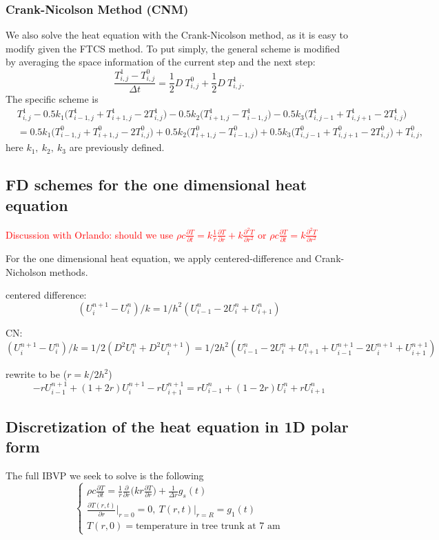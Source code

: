 \documentclass[12pt]{article}
\begin{document}
\subsubsection{Crank-Nicolson Method (CNM)}
We also solve the heat equation with the Crank-Nicolson method, as it is easy to modify given the FTCS method. To put simply, the general scheme is modified by averaging the space information of the current step and the next step:
\begin{equation}
\frac{T^1_{i,j}-T^0_{i,j}}{\Delta t}=\frac{1}{2}D\ T^0_{i,j}+\frac{1}{2}D\ T^1_{i,j}.
\end{equation}
The specific scheme is 
\begin{align}
& T^1_{i,j}-0.5k_1\bigg(T^1_{i-1,j}+T^1_{i+1,j}-2T^1_{i,j}\bigg)-0.5k_2\bigg(T^1_{i+1,j}-T^1_{i-1,j}\bigg)
-0.5k_3\bigg(T^1_{i,j-1}+T^1_{i,j+1}-2T^1_{i,j}\bigg)\nonumber\\
&= 0.5k_1\bigg(T^0_{i-1,j}+T^0_{i+1,j}-2T^0_{i,j}\bigg)+0.5k_2\bigg(T^0_{i+1,j}-T^0_{i-1,j}\bigg)
+0.5k_3\bigg(T^0_{i,j-1}+T^0_{i,j+1}-2T^0_{i,j}\bigg)+T^0_{i,j},
\end{align}
here $k_1,\ k_2,\ k_3$ are previously defined. 

\subsection{FD schemes for the one dimensional heat equation}

\textcolor{red}{Discussion with Orlando: should we use $\rho c\frac{\partial T}{\partial t}=k\frac{1}{r}\frac{\partial T}{\partial r}+k\frac{\partial^2T}{\partial r^2}$ or $\rho c\frac{\partial T}{\partial t}=k\frac{\partial^2T}{\partial r^2}$}

For the one dimensional heat equation, we apply centered-difference and Crank-Nicholson methods. 

centered difference:
$$(U^{n+1}_i - U^n_i)/k = 1/h^2 (U^n_{i-1} - 2U^n_i + U^n_{i+1})$$

CN:
$$(U^{n+1}_i - U^n_i)/k = 1/2 (D^2U^n_i + D^2U^{n+1}_i) 
=1/2h^2(U^n_{i-1} - 2U^n_i + U^n_{i+1} + U^{n+1}_{i-1} - 2U^{n+1}_i + U^{n+1}_{i+1})$$  

rewrite to be ($r=k/2h^2$)
$$-r U^{n+1}_{i-1} + (1+2r) U^{n+1}_i - r U^{n+1}_{i+1} = 
r U^n_{i-1} + (1-2r) U^n_i + r U^n_{i+1}$$

\subsection{Discretization of the heat equation in 1D polar form}
The full IBVP we seek to solve is the following
\begin{equation}
\begin{cases} \rho c\frac{\partial T}{\partial t}=\frac{1}{r}\frac{\partial}{\partial r}\bigg(kr\frac{\partial T}{\partial r}\bigg) + \frac{1}{\Delta r}g_s(t)\\
\frac{\partial T(r,t)}{\partial r}\bigg|_{r=0} = 0,\ T(r,t)\bigg|_{r = R} = g_1(t)\\
T(r,0) = \text{temperature in tree trunk at 7 am}
\end{cases}
\end{equation}
\end{document}
